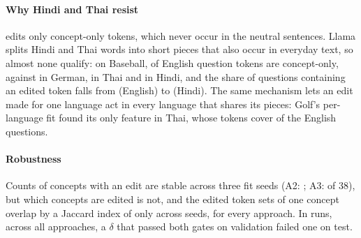\paragraph{Why Hindi and Thai resist}
\ember{} edits only concept-only tokens, which never occur in the neutral sentences.
Llama splits Hindi and Thai words into short pieces that also occur in everyday text, so almost none qualify: on Baseball,  of English question tokens are concept-only, against  in German,  in Thai and  in Hindi, and the share of questions containing an edited token falls from  (English) to  (Hindi).
The same mechanism lets an edit made for one language act in every language that shares its pieces: Golf's per-language fit found its only feature in Thai, whose tokens cover  of the English questions.

\paragraph{Robustness}
Counts of concepts with an edit are stable across three fit seeds (A2: ; A3:  of 38), but which concepts are edited is not, and the edited token sets of one concept overlap by a Jaccard index of only  across seeds, for every approach.
In  runs, across all approaches, a $\delta$ that passed both gates on validation failed one on test.
